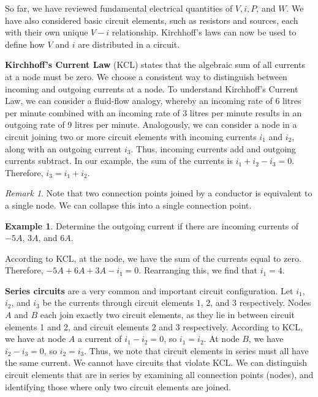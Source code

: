 \documentclass[11pt]{article}
\theoremstyle{plain} %
\theoremstyle{definition}
\theoremstyle{example}
\newtheorem*{example}{Example}
\theoremstyle{remark}
\newtheorem*{remark}{Remark}
\begin{document}
So far, we have reviewed fundamental electrical quantities of $V, i, P$, and $W$. We have also considered basic circuit elements, such as resistors and sources, each with their own unique $V-i$ relationship. Kirchhoff's laws can now be used to define how $V$ and $i$ are distributed in a circuit. 

\textbf{Kirchhoff's Current Law} (KCL) states that the algebraic sum of all currents at a node must be zero. We choose a consistent way to distinguish between incoming and outgoing currents at a node. To understand Kirchhoff's Current Law, we can consider a fluid-flow analogy, whereby an incoming rate of 6 litres per minute combined with an incoming rate of 3 litres per minute results in an outgoing rate of 9 litres per minute. Analogously, we can consider a node in a circuit joining two or more circuit elements with incoming currents $i_1$ and $i_2$, along with an outgoing current $i_3$. Thus, incoming currents add and outgoing currents subtract. In our example, the sum of the currents is $i_1+i_2-i_3=0$. Therefore, $i_3 = i_1+i_2$. 

\begin{remark}
Note that two connection points joined by a conductor is equivalent to a single node. We can collapse this into a single connection point. 
\end{remark}

\begin{example}
Determine the outgoing current if there are incoming currents of $-5A$, $3A$, and $6A$. 
\end{example}

According to KCL, at the node, we have the sum of the currents equal to zero. Therefore, $-5A+6A+3A-i_1=0$. Rearranging this, we find that $i_1=4$. 

\textbf{Series circuits} are a very common and important circuit configuration. Let $i_1$, $i_2$, and $i_3$ be the currents through circuit elements $1$, $2$, and $3$ respectively. Nodes $A$ and $B$ each join exactly two circuit elements, as they lie in between circuit elements 1 and 2, and circuit elements 2 and 3 respectively. According to KCL, we have at node $A$ a current of $i_1-i_2=0$, so $i_1=i_2$. At node $B$, we have $i_2-i_3=0$, so $i_2=i_3$. Thus, we note that circuit elements in series must all have the same current. We cannot have circuits that violate KCL. We can distinguish circuit elements that are in series by examining all connection points (nodes), and identifying those where only two circuit elements are joined. 
\end{document}

